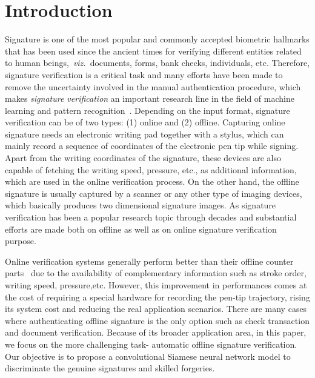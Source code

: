 \documentclass[times,twocolumn,final]{elsarticle}
\newcommand{\viz}{\textit{viz.}}
\begin{document}
\section{Introduction}
\label{s:intro}
Signature is one of the most popular and commonly accepted biometric hallmarks that has been used since the ancient times for verifying different entities related to human beings,~\viz~documents, forms, bank checks, individuals, etc. Therefore, signature verification is a critical task and many efforts have been made to remove the uncertainty involved in the manual authentication procedure, which makes \emph{signature verification} an important research line in the field of machine learning and pattern recognition~\cite{Plamondon2000, Impedovo2008}. Depending on the input format, signature verification can be of two types: (1) online and (2) offline. Capturing online signature needs an electronic writing pad together with a stylus, which can mainly record a sequence of coordinates of the electronic pen tip while signing. Apart from the writing coordinates of the signature, these devices are also capable of fetching the writing speed, pressure, etc., as additional information, which are used in the online verification process. On the other hand, the offline signature is usually captured by a scanner or any other type of imaging devices, which basically produces two dimensional signature images. As signature verification has been a popular research topic through decades and substantial efforts are made both on offline as well as on online signature verification purpose.

Online verification systems generally perform better than their offline counter parts~\cite{Munich2003} due to the availability of complementary information such as stroke order, writing speed, pressure,etc. However, this improvement in performances comes at the cost of requiring a special hardware for 
recording the pen-tip trajectory, rising its system cost and reducing the real application scenarios. There are many cases where authenticating offline signature is the only option such as check transaction and document verification. Because of its broader application area, in this paper, we focus on the more challenging task- automatic offline signature verification. Our objective is to propose a convolutional Siamese neural network model to discriminate the genuine signatures and skilled forgeries.
\end{document}
